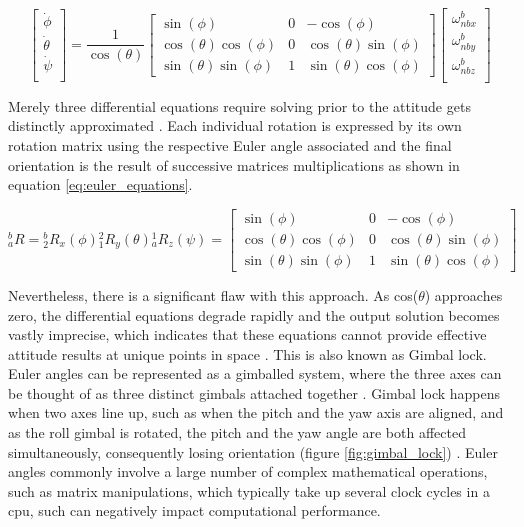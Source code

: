 \begin{equation}
    \begin{bmatrix}
        \dot{\phi}   \\
        \dot{\theta} \\
        \dot{\psi}   \\
    \end{bmatrix}
    =
    \frac{1}{\cos(\theta)}
    \begin{bmatrix}
        \sin(\phi)             & 0 & -\cos(\phi)            \\
        \cos(\theta)\cos(\phi) & 0 & \cos(\theta)\sin(\phi) \\
        \sin(\theta)\sin(\phi) & 1 & \sin(\theta)\cos(\phi)
    \end{bmatrix}
    \begin{bmatrix}
        \omega{^b_{nbx}} \\
        \omega{^b_{nby}} \\
        \omega{^b_{nbz}} \\
    \end{bmatrix}
    \label{eq:euler_equation}
\end{equation}

Merely three differential equations require solving prior to the attitude gets distinctly approximated \cite{bar1985attitude}. Each individual rotation is expressed by its own rotation matrix using the respective Euler angle associated and the final orientation is the result of successive matrices multiplications as shown in equation \ref{eq:euler_equations}.

\begin{equation}
    {^b_a}R = {^b_2}R_x(\phi){^2_1}R_y(\theta){^1_a}R_z(\psi)
    =
    \begin{bmatrix}
        \sin(\phi)             & 0 & -\cos(\phi)            \\
        \cos(\theta)\cos(\phi) & 0 & \cos(\theta)\sin(\phi) \\
        \sin(\theta)\sin(\phi) & 1 & \sin(\theta)\cos(\phi)
    \end{bmatrix}
    \label{eq:euler_equations}
\end{equation}

Nevertheless, there is a significant flaw with this approach. As cos($\theta$) approaches zero, the differential equations degrade rapidly and the output solution becomes vastly imprecise, which indicates that these equations cannot provide effective attitude results at unique points in space \cite{spring1986euler}. This is also known as Gimbal lock. Euler angles can be represented as a gimballed system, where the three axes can be thought of as three distinct gimbals attached together \cite{mcconnell1967kinematics}. Gimbal lock happens when two axes line up, such as when the pitch and the yaw axis are aligned, and as the roll gimbal is rotated, the pitch and the yaw angle are both affected simultaneously, consequently losing orientation (figure \ref{fig:gimbal_lock}) \cite{hemingway2018perspectives}.
Euler angles commonly involve a large number of complex mathematical operations, such as matrix manipulations, which typically take up several clock cycles in a \acrfull{cpu}, such can negatively impact computational performance.

